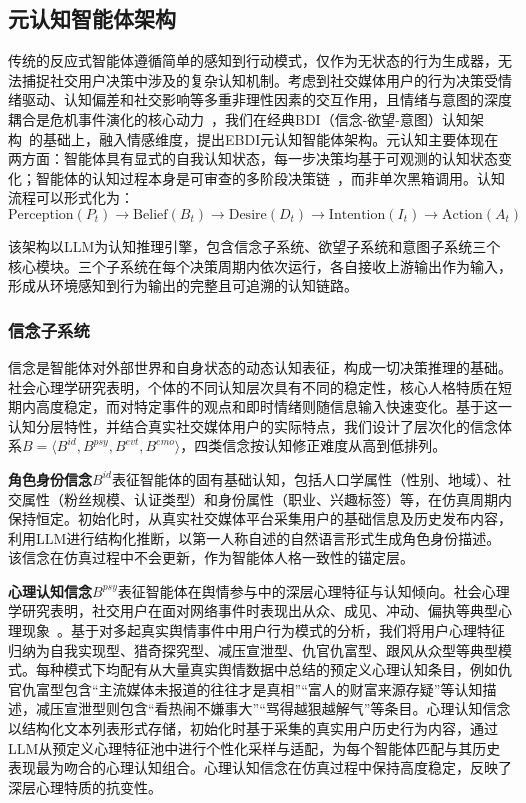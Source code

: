 \documentclass[a4paper,fleqn]{cas-sc}
\begin{document}
\subsection{元认知智能体架构}\label{subsec:agent}

传统的反应式智能体遵循简单的感知到行动模式，仅作为无状态的行为生成器，无法捕捉社交用户决策中涉及的复杂认知机制。考虑到社交媒体用户的行为决策受情绪驱动、认知偏差和社交影响等多重非理性因素的交互作用，且情绪与意图的深度耦合是危机事件演化的核心动力~\citep{myint2024crisis_mtl_intent}，我们在经典BDI（信念-欲望-意图）认知架构~\citep{bratman_intention_1987,rao_bdi_1995}的基础上，融入情感维度，提出EBDI元认知智能体架构。元认知主要体现在两方面：智能体具有显式的自我认知状态，每一步决策均基于可观测的认知状态变化；智能体的认知过程本身是可审查的多阶段决策链~\citep{wei_chain_2022}，而非单次黑箱调用。认知流程可以形式化为：
\begin{equation}
\text{Perception}(P_t) \!\to\! \text{Belief}(B_t) \!\to\! \text{Desire}(D_t) \!\to\! \text{Intention}(I_t) \!\to\! \text{Action}(A_t)
\end{equation}

该架构以LLM为认知推理引擎，包含信念子系统、欲望子系统和意图子系统三个核心模块。三个子系统在每个决策周期内依次运行，各自接收上游输出作为输入，形成从环境感知到行为输出的完整且可追溯的认知链路。

\subsubsection{信念子系统}

信念是智能体对外部世界和自身状态的动态认知表征，构成一切决策推理的基础。社会心理学研究表明，个体的不同认知层次具有不同的稳定性，核心人格特质在短期内高度稳定，而对特定事件的观点和即时情绪则随信息输入快速变化。基于这一认知分层特性，并结合真实社交媒体用户的实际特点，我们设计了层次化的信念体系$B = \langle B^{id}, B^{psy}, B^{evt}, B^{emo} \rangle$，四类信念按认知修正难度从高到低排列。

\textbf{角色身份信念}$B^{id}$表征智能体的固有基础认知，包括人口学属性（性别、地域）、社交属性（粉丝规模、认证类型）和身份属性（职业、兴趣标签）等，在仿真周期内保持恒定。初始化时，从真实社交媒体平台采集用户的基础信息及历史发布内容，利用LLM进行结构化推断，以第一人称自述的自然语言形式生成角色身份描述。该信念在仿真过程中不会更新，作为智能体人格一致性的锚定层。

\textbf{心理认知信念}$B^{psy}$表征智能体在舆情参与中的深层心理特征与认知倾向。社会心理学研究表明，社交用户在面对网络事件时表现出从众、成见、冲动、偏执等典型心理现象~\citep{buckels2014trolls}。基于对多起真实舆情事件中用户行为模式的分析，我们将用户心理特征归纳为自我实现型、猎奇探究型、减压宣泄型、仇官仇富型、跟风从众型等典型模式。每种模式下均配有从大量真实舆情数据中总结的预定义心理认知条目，例如仇官仇富型包含“主流媒体未报道的往往才是真相”“富人的财富来源存疑”等认知描述，减压宣泄型则包含“看热闹不嫌事大”“骂得越狠越解气”等条目。心理认知信念以结构化文本列表形式存储，初始化时基于采集的真实用户历史行为内容，通过LLM从预定义心理特征池中进行个性化采样与适配，为每个智能体匹配与其历史表现最为吻合的心理认知组合。心理认知信念在仿真过程中保持高度稳定，反映了深层心理特质的抗变性。
\end{document}
